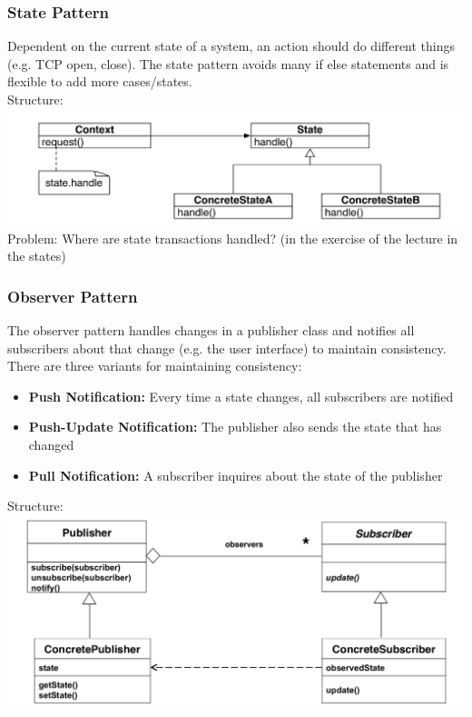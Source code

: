\subsubsection{State Pattern}
Dependent on the current state of a system, an action should do different things (e.g. TCP open, close).
The state pattern avoids many if else statements and is flexible to add more cases/states.\\
Structure:\\
\includegraphics[width=\linewidth]{images/pattern_state.png}
Problem: Where are state transactions handled? (in the exercise of the lecture in the states)
\newpage

\subsubsection{Observer Pattern}
The observer pattern handles changes in a publisher class and notifies all subscribers about that change (e.g. the user interface) to maintain consistency.
There are three variants for maintaining consistency:
\begin{itemize}
  \item \textbf{Push Notification:} Every time a state changes, all subscribers are notified
  \item \textbf{Push-Update Notification:} The publisher also sends the state that has changed
  \item \textbf{Pull Notification:} A subscriber inquires about the state of the publisher
\end{itemize}
Structure:\\
\includegraphics[width=\linewidth]{images/pattern_observer.png}
\newpage

